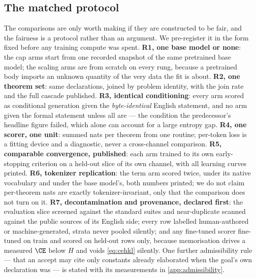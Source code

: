 \subsection{The matched protocol}
\label{sec:method:protocol}

The comparisons are only worth making if they are constructed to be fair, and
the fairness is a protocol rather than an argument.
We pre-register it in the form fixed before any training compute was spent.
\textbf{R1, one base model or none}:
the cap arms start from one recorded snapshot of the same pretrained base model;
the scaling arms are from scratch on every rung, because a pretrained body
imports an unknown quantity of the very data the fit is about.
\textbf{R2, one theorem set}:
same declarations, joined by problem identity, with the join rate and the full
cascade published.
\textbf{R3, identical conditioning}:
every arm scored as conditional generation given the \emph{byte-identical}
English statement, and no arm given the formal statement unless all are --- the
condition the predecessor's headline figure failed, which alone can account for
a large entropy gap.
\textbf{R4, one scorer, one unit}:
summed nats per theorem from one routine; per-token loss is a fitting device and
a diagnostic, never a cross-channel comparison.
\textbf{R5, comparable convergence, published}:
each arm trained to its own early-stopping criterion on a held-out slice of its
own channel, with all learning curves printed.
\textbf{R6, tokenizer replication}:
the term arm scored twice, under its native vocabulary and under the base
model's, both numbers printed;
we do not claim per-theorem nats are exactly tokenizer-invariant, only that the
comparison does not turn on it.
\textbf{R7, decontamination and provenance, declared first}:
the evaluation slice screened against the standard suites and near-duplicate
scanned against the public sources of its English side;
every row labelled human-authored or machine-generated, strata never pooled
silently;
and any fine-tuned scorer fine-tuned on train and scored on held-out rows only,
because memorisation drives a measured \(\CE\) below \(H\) and voids
\cref{eq:cehkl} silently.
One further admissibility rule --- that an accept may cite only constants already
elaborated when the goal's own declaration was --- is stated with its
measurements in \cref{app:admissibility}.
